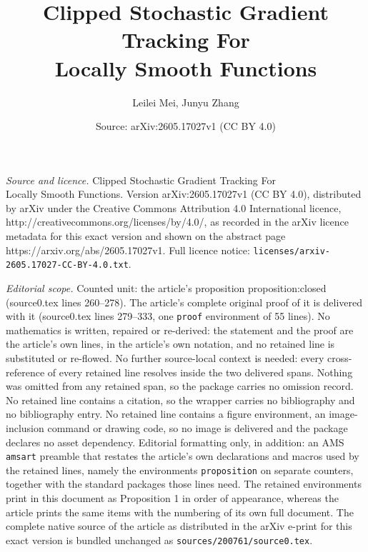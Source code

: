 \documentclass[10pt,a4paper]{amsart}
\title{Clipped Stochastic Gradient Tracking For\\ Locally Smooth Functions}
\author{Leilei Mei, Junyu Zhang}
\date{Source: arXiv:2605.17027v1 (CC BY 4.0)}
\begin{document}
\maketitle

\noindent\emph{Source and licence.} Clipped Stochastic Gradient Tracking For\\ Locally Smooth Functions. Version arXiv:2605.17027v1 (CC BY 4.0), distributed by arXiv under the Creative Commons Attribution 4.0 International licence, http://creativecommons.org/licenses/by/4.0/, as recorded in the arXiv licence metadata for this exact version and shown on the abstract page https://arxiv.org/abs/2605.17027v1. Full licence notice: \texttt{licenses/arxiv-2605.17027-CC-BY-4.0.txt}.\par\smallskip

\noindent\textit{Editorial scope.} Counted unit: the article's proposition proposition:closed (source0.tex lines 260--278). The article's complete original proof of it is delivered with it (source0.tex lines 279--333, one \texttt{proof} environment of 55 lines). No mathematics is written, repaired or re-derived: the statement and the proof are the article's own lines, in the article's own notation, and no retained line is substituted or re-flowed.  No further source-local context is needed: every cross-reference of every retained line resolves inside the two delivered spans.  Nothing was omitted from any retained span, so the package carries no omission record.  No retained line contains a citation, so the wrapper carries no bibliography and no bibliography entry.  No retained line contains a figure environment, an image-inclusion command or drawing code, so no image is delivered and the package declares no asset dependency.  Editorial formatting only, in addition: an AMS \texttt{amsart} preamble that restates the article's own declarations and macros used by the retained lines, namely the environments \texttt{proposition} on separate counters, together with the standard packages those lines need.  The retained environments print in this document as Proposition 1 in order of appearance, whereas the article prints the same items with the numbering of its own full document.  The complete native source of the article as distributed in the arXiv e-print for this exact version is bundled unchanged as \texttt{sources/200761/source0.tex}.
\end{document}
